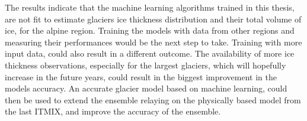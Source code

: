 The results indicate that the machine learning algorithms trained in this thesis, are not fit to estimate glaciers ice thickness distribution and their total volume of ice, for the alpine region. Training the models with data from other regions and measuring their performances would be the next step to take.  Training with more input data, could also result in a different outcome. The availability of more ice thickness observations, especially for the largest glaciers, which will hopefully increase in the future years, could result in the biggest improvement in the models accuracy. An accurate glacier model based on machine learning, could then be used to extend the ensemble relaying on the physically based model from the last ITMIX, and improve the accuracy of the ensemble. 
%
%
